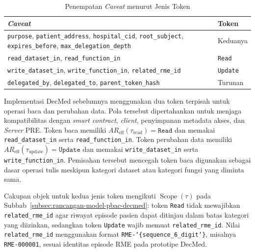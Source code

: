 \begin{table}[H]
	\centering
	\caption{Penempatan \textit{Caveat} menurut Jenis Token}
	\label{tab:penempatan-caveat-macaroon}
	\small
	\begin{tabular}{|p{}|p{}|}
		\hline
		\textbf{\textit{Caveat}}
		 & \textbf{Token}  \\ \hline

		\texttt{purpose}, \texttt{patient\_address}, \texttt{hospital\_cid}, \texttt{root\_subject}, \texttt{expires\_before}, \texttt{max\_delegation\_depth}
		 & Keduanya        \\ \hline

		\texttt{read\_dataset\_in}, \texttt{read\_function\_in}
		 & \texttt{Read}   \\ \hline

		\texttt{write\_dataset\_in}, \texttt{write\_function\_in}, \texttt{related\_rme\_id}
		 & \texttt{Update} \\ \hline

		\texttt{delegated\_by}, \texttt{delegated\_to}, \texttt{parent\_token\_hash}
		 & Turunan         \\ \hline
	\end{tabular}
\end{table}

Implementasi DecMed sebelumnya menggunakan dua token terpisah untuk operasi baca dan perubahan data. Pola tersebut dipertahankan untuk menjaga kompatibilitas dengan \textit{smart contract}, \textit{client}, penyimpanan metadata akses, dan \textit{Server} PRE. Token baca memiliki $AR_{\operatorname{eff}}(\tau_{\operatorname{read}})=\texttt{Read}$ dan memakai \texttt{read\_dataset\_in} serta \texttt{read\_function\_in}. Token perubahan data memiliki $AR_{\operatorname{eff}}(\tau_{\operatorname{update}})=\texttt{Update}$ dan memakai \texttt{write\_dataset\_in} serta \texttt{write\_function\_in}. Pemisahan tersebut mencegah token baca digunakan sebagai dasar operasi tulis meskipun kategori dataset atau kategori fungsi yang diminta sama.

Cakupan objek untuk kedua jenis token mengikuti $\operatorname{Scope}(\tau)$ pada Subbab~\ref{subsec:rancangan-model-pbac-decmed}: token \texttt{Read} tidak mewajibkan \texttt{related\_rme\_id} agar riwayat episode pasien dapat ditinjau dalam batas kategori yang diizinkan, sedangkan token \texttt{Update} wajib memuat \texttt{related\_rme\_id}. Nilai \texttt{related\_rme\_id} menggunakan format \texttt{RME-\char`\{sequence\_6\_digit\char`\}}, misalnya \texttt{RME-000001}, sesuai identitas episode RME pada prototipe DecMed.

